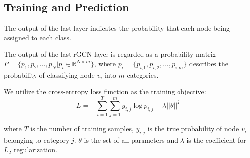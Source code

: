 \subsection{Training and Prediction}
The output of the last layer indicates the probability that each node being assigned to each class.

The output of the last rGCN layer is regarded as a probability matrix $P=\{p_1,p_2,...,p_N|p_i\in \mathbb{R}^{N \times m}\}$, where $p_i=\{p_{i,1},p_{i,2},...,p_{i,m}\}$ describes the probability of classifying node $v_i$ into $m$ categories. 

We utilize the cross-entropy loss function as the training objective:
\begin{equation}
L=-\sum_{i=1}^T\sum_{j=1}^m y_{i,j}\log p_{i,j}+\lambda ||\theta||^2
\end{equation}

\noindent where $T$ is the number of training samples, $y_{i,j}$ is the true probability of node $v_i$ belonging to category $j$. $\theta$ is the set of all parameters and $\lambda$ is the coefficient for $L_2$  regularization.
